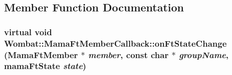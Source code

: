 \subsection{Member Function Documentation}
\hypertarget{classWombat_1_1MamaFtMemberCallback_a41a9fdaf6c234ab776f48a2ca2553de9}{
\subsubsection[{onFtStateChange}]{\setlength{\rightskip}{0pt plus 5cm}virtual void Wombat::MamaFtMemberCallback::onFtStateChange ({\bf MamaFtMember} $\ast$ {\em member}, \/  const char $\ast$ {\em groupName}, \/  mamaFtState {\em state})}}
\label{classWombat_1_1MamaFtMemberCallback_a41a9fdaf6c234ab776f48a2ca2553de9}
